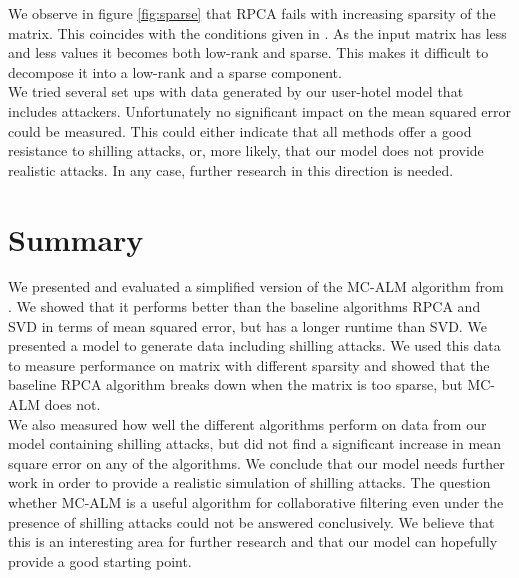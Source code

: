 \documentclass[10pt,conference,compsocconf]{IEEEtran}
\begin{document}
We observe in figure \ref{fig:sparse} that RPCA fails with increasing sparsity of the matrix. This coincides with the conditions given in \cite{rpcapaper}. As the input matrix has less and less values it becomes both low-rank and sparse. This makes it difficult to decompose it into a low-rank and a sparse component. \\

We tried several set ups with data generated by our user-hotel model that includes attackers. Unfortunately no significant impact on the mean squared error could be measured. This could either indicate that all methods offer a good resistance to shilling attacks, or, more likely, that our model does not provide realistic attacks. In any case, further research in this direction is needed.

\section{Summary}
We presented and evaluated a simplified version of the MC-ALM algorithm from \cite{almpaper}. We showed that it performs better than the baseline algorithms RPCA and SVD in terms of mean squared error, but has a longer runtime than SVD. We presented a model to generate data including shilling attacks. We used this data to measure performance on matrix with different sparsity and showed that the baseline RPCA algorithm breaks down when the matrix is too sparse, but MC-ALM does not. \\

We also measured how well the different algorithms perform on data from our model containing shilling attacks, but did not find a significant increase in mean square error on any of the algorithms. We conclude that our model needs further work in order to provide a realistic simulation of shilling attacks. The question whether MC-ALM is a useful algorithm for collaborative filtering even under the presence of shilling attacks could not be answered conclusively. We believe that this is an interesting area for further research and that our model can hopefully provide a good starting point.




\end{document}
